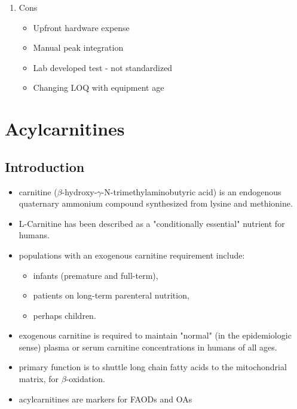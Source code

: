 \documentclass{scrartcl}
\begin{document}
\begin{enumerate}
\begin{enumerate}
\item Cons
\label{sec:orgc1029e7}
\begin{itemize}
\item Upfront hardware expense
\item Manual peak integration
\item Lab developed test - not standardized
\item Changing LOQ with equipment age
\end{itemize}
\end{enumerate}
\end{enumerate}
\section{Acylcarnitines}
\label{sec:org57ff7be}
\subsection{Introduction}
\label{sec:orgd4b40c2}
\begin{itemize}
\item carnitine (\(\beta\)-hydroxy-\(\gamma\)-N-trimethylaminobutyric acid) is
an endogenous quaternary ammonium compound synthesized from lysine
and methionine.
\item L-Carnitine has been described as a "conditionally essential"
nutrient for humans.
\item populations with an exogenous carnitine requirement include:
\begin{itemize}
\item infants (premature and full-term),
\item patients on long-term parenteral nutrition,
\item perhaps children.
\end{itemize}
\item exogenous carnitine is required to maintain "normal" (in the
epidemiologic sense) plasma or serum carnitine concentrations in
humans of all ages.
\item primary function is to shuttle long chain fatty acids to the
mitochondrial matrix, for \(\beta\)-oxidation.
\item acylcarnitines are markers for FAODs and OAs
\end{itemize}

\vspace{2em}

\hspace{3em}
\end{document}

